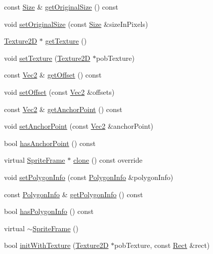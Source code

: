 \begin{DoxyCompactItemize}
\item 
const \hyperlink{classSize}{Size} \& \hyperlink{classSpriteFrame_a84fd321bbc5f807dd5a5c48e371c7058}{get\+Original\+Size} () const
\item 
void \hyperlink{classSpriteFrame_a59473dbd75737dee69855a0c7acf913f}{set\+Original\+Size} (const \hyperlink{classSize}{Size} \&size\+In\+Pixels)
\item 
\hyperlink{classTexture2D}{Texture2D} $\ast$ \hyperlink{classSpriteFrame_a5d6a0de7d4263f8ad0e3a568a7a10e06}{get\+Texture} ()
\item 
void \hyperlink{classSpriteFrame_ae4908b4831f92cad38ff57af56c396e0}{set\+Texture} (\hyperlink{classTexture2D}{Texture2D} $\ast$pob\+Texture)
\item 
const \hyperlink{classVec2}{Vec2} \& \hyperlink{classSpriteFrame_ae0684b6949155845e801e7807045a585}{get\+Offset} () const
\item 
void \hyperlink{classSpriteFrame_a124c5d3b77a94966cf6c5ae428f9733c}{set\+Offset} (const \hyperlink{classVec2}{Vec2} \&offsets)
\item 
const \hyperlink{classVec2}{Vec2} \& \hyperlink{classSpriteFrame_a3c5048e43ffe077820fd4814b6576371}{get\+Anchor\+Point} () const
\item 
void \hyperlink{classSpriteFrame_a04d7b2e3d26984c6d47f82937cb226d1}{set\+Anchor\+Point} (const \hyperlink{classVec2}{Vec2} \&anchor\+Point)
\item 
bool \hyperlink{classSpriteFrame_acd8ff32e01d3692e36fb98b772c583e6}{has\+Anchor\+Point} () const
\item 
virtual \hyperlink{classSpriteFrame}{Sprite\+Frame} $\ast$ \hyperlink{classSpriteFrame_aaf6270892ebccf210b1823a3d1e1321e}{clone} () const override
\item 
void \hyperlink{classSpriteFrame_ab4bf60eb887f7080959952e8e33f23c2}{set\+Polygon\+Info} (const \hyperlink{classPolygonInfo}{Polygon\+Info} \&polygon\+Info)
\item 
const \hyperlink{classPolygonInfo}{Polygon\+Info} \& \hyperlink{classSpriteFrame_a013f292263cbefc030e62e43bd22bc29}{get\+Polygon\+Info} () const
\item 
bool \hyperlink{classSpriteFrame_aab1aa0e4f123b7b5be53bcc26edf1d26}{has\+Polygon\+Info} () const
\item 
virtual \hyperlink{classSpriteFrame_a871d849613f969d6b3abe62095167531}{$\sim$\+Sprite\+Frame} ()
\item 
bool \hyperlink{classSpriteFrame_ab6f82a9d511a1aeb016621dabda96669}{init\+With\+Texture} (\hyperlink{classTexture2D}{Texture2D} $\ast$pob\+Texture, const \hyperlink{classRect}{Rect} \&rect)

\end{DoxyCompactItemize}
